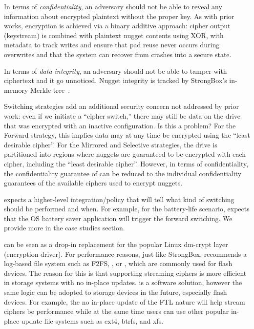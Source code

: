  In terms of {\em confidentiality}, an
adversary should not be able to reveal any information about encrypted plaintext
without the proper key. As with prior works, encryption is achieved via a binary
additive approach: cipher output (keystream) is combined with plaintext nugget
contents using XOR, with metadata to track writes and ensure that pad reuse
never occurs during overwrites and that the system can recover from crashes into
a secure state.

In terms of {\em data integrity}, an adversary should not be able to tamper with
ciphertext and it go unnoticed. Nugget integrity is tracked by StrongBox's
in-memory Merkle tree~\cite{StrongBox}.

Switching strategies add an additional security concern not addressed by prior
work: even if we initiate a ``cipher switch,'' there may still be data on the
drive that was encrypted with an inactive configuration. Is this a problem? For
the Forward strategy, this implies data may at any time be encrypted using the
``least desirable cipher''. For the Mirrored and Selective strategies, the drive
is partitioned into regions where nuggets are guaranteed to be encrypted with
each cipher, including the ``least desirable cipher''. However, in terms of
confidentiality, the confidentiality guarantee of \sys can be reduced to the
individual confidentiality guarantees of the available ciphers used to encrypt
nuggets. 

 \sys expects a higher-level integration/policy
that will tell \sys what kind of switching should be performed and when. For
example, for the battery-life scenario, \sys expects that the OS battery saver
application will trigger the forward switching. We provide more in the case
studies section.

 \sys can be seen as a drop-in replacement for the popular
Linux dm-crypt layer (encryption driver). For performance reasons, just like
StrongBox, \sys recommends a log-based file system such as F2FS, \xxx, or \xxx,
which are commonly used for flash devices. The reason for this is that
supporting streaming ciphers is more efficient in storage systems with no
in-place updates. \sys is a software solution, however the same logic can be
adopted to storage devices in the future, especially flash devices. For example,
the no in-place update of the FTL nature will help stream ciphers be performance
while at the same time users can use other popular in-place update file systems
such as ext4, btrfs, and xfs.

